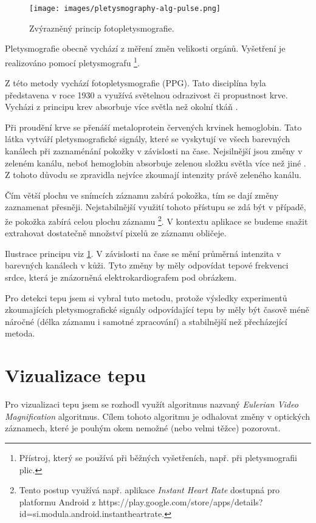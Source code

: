 \documentclass[
  digital, %
  table,   %
%
  lof,     %
  lot,     %
]{fithesis3}
\begin{document}
\begin{figure}
  \begin{center}
    \texttt{[image: images/pletysmography-alg-pulse.png]}
  \end{center}
  \caption{Zvýrazněný princip fotopletysmografie.}
  \label{fig:pletysmography-princip}
\end{figure}

Pletysmografie obecně vychází z měření změn velikosti orgánů. Vyšetření je realizováno pomocí pletysmografu \footnote{Přístroj, který se používá při běžných vyšetřeních, např. při pletysmografii plic.}.

Z této metody vychází fotopletysmografie (PPG). Tato disciplína byla představena v roce 1930 a využívá světelnou odrazivost či propustnost krve. Vycházi z principu krev absorbuje více světla než okolní tkáň \cite{photo-plethysmographic}.

Při proudění krve se přenáší metaloprotein červených krvinek hemoglobin. Tato látka vytváří pletysmografické signály, které se vyskytují ve všech barevných kanálech při zaznaménání pokožky v závislosti na čase. Nejsilnější jsou změny v zeleném kanálu, neboť hemoglobin absorbuje zelenou složku světla více než jiné \cite{green-channel-strongest}. Z tohoto důvodu se zpravidla nejvíce zkoumají intenzity právě zeleného kanálu.

Čím větší plochu ve snímcích záznamu zabírá pokožka, tím se dají změny zaznamenat přesněji. Nejstabilnější využití tohoto přístupu se zdá být v případě, že pokožka zabírá celou plochu záznamu
\footnote{Tento postup využívá např. aplikace \emph{Instant Heart Rate} dostupná pro platformu Android z https://play.google.com/store/apps/details?id=si.modula.android.instantheartrate.}. V kontextu aplikace se budeme snažit extrahovat dostatečně množství pixelů ze záznamu obličeje.

Ilustrace principu viz \ref{fig:pletysmography-princip}. V závislosti na čase se mění průměrná intenzita v barevných kanálech v kůži. Tyto změny by měly odpovídat tepové frekvenci srdce, která je znázorněná elektrokardiografem pod obrázkem.

Pro detekci tepu jsem si vybral tuto metodu, protože výsledky experimentů\cite{remote-plethysmographic} zkoumajících pletysmografické signály odpovídající tepu by měly být časově méně náročné (délka záznamu i samotné zpracování) a stabilnější než přecházející metoda.

\section {Vizualizace tepu}
Pro vizualizaci tepu jsem se rozhodl využít algoritmus nazvaný \emph{Eulerian Video Magnification}\cite{eulerian-magnification} algoritmus. Cílem tohoto algoritmu je odhalovat změny v optických záznamech, které je pouhým okem nemožné (nebo velmi těžce) pozorovat.
\end{document}

